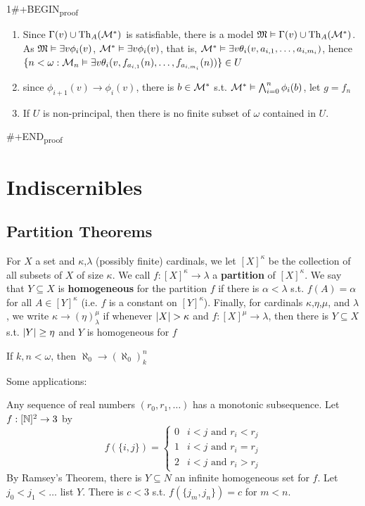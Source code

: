 \documentclass[11pt]{article}
\begin{document}
1\#+BEGIN\textsubscript{proof}
\begin{enumerate}
\item Since \(\Gamma(v)\cup\operatorname{Th}_A(\mathcal{M}^*)\) is satisfiable, there is a model \(\mathfrak{M}\vDash\Gamma(v)\cup\operatorname{Th}_A(\mathcal{M}^*)\).
As \(\mathfrak{M}\vDash\exists v\phi_i(v)\), \(\mathcal{M}^*\vDash\exists v\phi_i(v)\), that is, \(\mathcal{M}^*\vDash\exists v\theta_i(v,a_{i,1},\dots,a_{i,m_i})\), hence
\(\{n<\omega:\mathcal{M}_n\vDash\exists v\theta_i(v,f_{a_{i,1}}(n),\dots,f_{a_{i,m_i}}(n))\}\in U\)
\item since \(\phi_{i+1}(v)\to\phi_i(v)\), there is \(b\in\mathcal{M}^*\) s.t. \(\mathcal{M}^*\vDash\bigwedge_{i=0}^n\phi_i(b)\), let \(g=f_n\)
\item If \(U\) is non-principal, then there is no finite subset of \(\omega\) contained in \(U\).
\end{enumerate}
\#+END\textsubscript{proof}

\section{Indiscernibles}
\label{sec:org21e536c}
\subsection{Partition Theorems}
\label{sec:orge6a8eda}
For \(X\) a set and \(\kappa\),\(\lambda\) (possibly finite) cardinals, we let \([X]^\kappa\) be the collection of all
subsets of \(X\) of size \(\kappa\). We call \(f:[X]^\kappa\to\lambda\) a \textbf{partition} of \([X]^\kappa\). We say
that \(Y\subseteq X\) is \textbf{homogeneous} for the partition \(f\) if there is \(\alpha<\lambda\) s.t. \(f(A)=\alpha\) for
all \(A\in[Y]^\kappa\) (i.e. \(f\) is a constant on \([Y]^\kappa\)). Finally, for cardinals \(\kappa\),\(\eta\),\(\mu\), and \(\lambda\), we
write \(\kappa\to(\eta)_\lambda^\mu\) if whenever \(\abs{X}>\kappa\) and \(f:[X]^\mu\to\lambda\), then there is \(Y\subseteq X\)
s.t. \(\abs{Y}\ge\eta\) and \(Y\) is homogeneous for \(f\)

\begin{theorem}
If \(k,n<\omega\), then \(\aleph_0\to(\aleph_0)^n_k\)
\end{theorem}

Some applications:

Any sequence of real numbers \((r_0,r_1,\dots)\) has a monotonic subsequence. Let \(f:[\mathbb{N}]^2\to 3\) by
\begin{equation*}
f(\{i,j\})=
\begin{cases}
0&i<j\text{ and }r_i<r_j\\
1&i<j\text{ and }r_i=r_j\\
2&i<j\text{ and }r_i>r_j
\end{cases}
\end{equation*}
By Ramsey's Theorem, there is \(Y\subseteq N\) an infinite homogeneous set for \(f\). Let \(j_0<j_1<\dots\)
list \(Y\). There is \(c<3\) s.t. \(f(\{j_m,j_n\})=c\) for \(m<n\).
\end{document}

